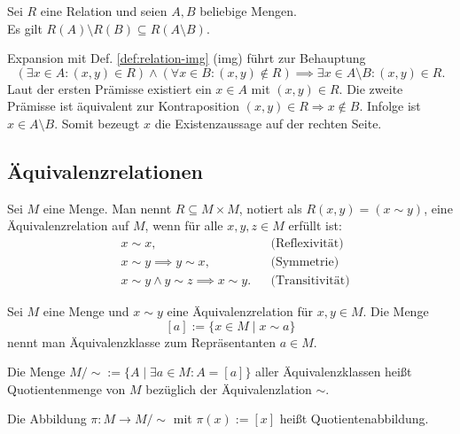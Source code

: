 \begin{Satz}
Sei $R$ eine Relation und seien $A,B$ beliebige Mengen.\\
Es gilt $R(A)\setminus R(B)\subseteq R(A\setminus B)$.
\end{Satz}
\begin{Beweis}
Expansion mit Def. \ref{def:relation-img} (img) führt zur Behauptung
\[(\exists x\in A\colon (x,y)\in R)\land (\forall x\in B\colon (x,y)\notin R)
\implies \exists x\in A\setminus B\colon (x,y)\in R.\]
Laut der ersten Prämisse existiert ein $x\in A$ mit $(x,y)\in R$. Die
zweite Prämisse ist äquivalent zur Kontraposition $(x,y)\in R\Rightarrow x\notin B$.
Infolge ist $x\in A\setminus B$. Somit bezeugt $x$ die
Existenzaussage auf der rechten Seite.\,\qedsymbol
\end{Beweis}

\subsection{Äquivalenzrelationen}

\begin{Definition}[Äquivalenzrelation]\newlinefirst
Sei $M$ eine Menge. Man nennt $R\subseteq M\times M$, notiert als
$R(x,y) = (x\sim y)$, eine Äquivalenzrelation auf $M$, wenn für alle
$x,y,z\in M$ erfüllt ist:%
\begin{align*}
& x\sim x, && \text{(Reflexivität)}\\
& x\sim y\implies y\sim x, && \text{(Symmetrie)}\\
& x\sim y\land y\sim z\implies x\sim y. && \text{(Transitivität)}
\end{align*}
\end{Definition}

\begin{Definition}[Äquivalenzklasse]\newlinefirst
Sei $M$ eine Menge und $x\sim y$ eine Äquivalenzrelation für $x,y\in M$.
Die Menge%
\[[a] := \{x\in M\mid x\sim a\}\]
nennt man Äquivalenzklasse zum Repräsentanten $a\in M$.
\end{Definition}

\begin{Definition}[Quotientenmenge]\newlinefirst
Die Menge $M/{\sim} := \{A\mid \exists a\in M\colon A = [a]\}$
aller Äquivalenzklassen heißt Quotientenmenge von $M$ bezüglich der
Äquivalenzlation ${\sim}$.
\end{Definition}

\begin{Definition}[Quotientenabbildung]\newlinefirst
Die Abbildung $\pi\colon M\to M/{\sim}$ mit $\pi(x):=[x]$
heißt Quotientenabbildung.
\end{Definition}

